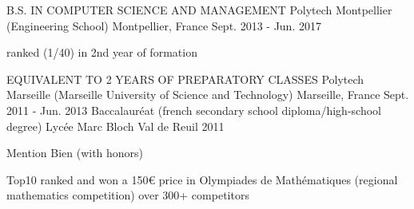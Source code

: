 \begin{cventries}
  \cventry
    {B.S. IN COMPUTER SCIENCE AND MANAGEMENT}
    {Polytech Montpellier (Engineering School)}
    {Montpellier, France}
    {Sept. 2013 - Jun. 2017}
    {
      \begin{cvitems}
        \item {ranked (1/40) in 2nd year of formation}
      \end{cvitems}
    }
  \cventry
    {EQUIVALENT TO 2 YEARS OF PREPARATORY CLASSES}
    {Polytech Marseille (Marseille University of Science and Technology)}
    {Marseille, France}
    {Sept. 2011 - Jun. 2013}
    {}
  \cventry
    {Baccalauréat (french secondary school diploma/high-school degree)}
    {Lycée Marc Bloch}
    {Val de Reuil}
    {2011}
    {
      \begin{cvitems}
        \item {Mention Bien (with honors)}
        \item {Top10 ranked and won a 150€ price  in Olympiades de Mathématiques (regional mathematics competition) over 300+ competitors}
      \end{cvitems}
    }
\end{cventries}
